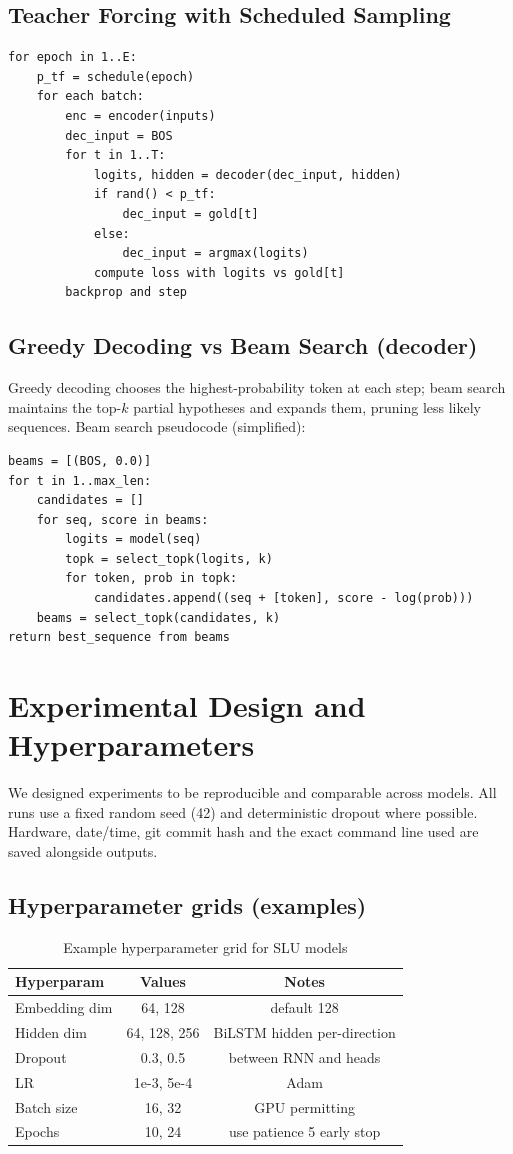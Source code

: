 \documentclass[conference]{IEEEtran}
\begin{document}
\subsection{Teacher Forcing with Scheduled Sampling}
\begin{verbatim}
for epoch in 1..E:
    p_tf = schedule(epoch)
    for each batch:
        enc = encoder(inputs)
        dec_input = BOS
        for t in 1..T:
            logits, hidden = decoder(dec_input, hidden)
            if rand() < p_tf:
                dec_input = gold[t]
            else:
                dec_input = argmax(logits)
            compute loss with logits vs gold[t]
        backprop and step
\end{verbatim}

\subsection{Greedy Decoding vs Beam Search (decoder)}
Greedy decoding chooses the highest-probability token at each step; beam search maintains the top-$k$ partial hypotheses and expands them, pruning less likely sequences. Beam search pseudocode (simplified):
\begin{verbatim}
beams = [(BOS, 0.0)]
for t in 1..max_len:
    candidates = []
    for seq, score in beams:
        logits = model(seq)
        topk = select_topk(logits, k)
        for token, prob in topk:
            candidates.append((seq + [token], score - log(prob)))
    beams = select_topk(candidates, k)
return best_sequence from beams
\end{verbatim}

\section{Experimental Design and Hyperparameters}
We designed experiments to be reproducible and comparable across models. All runs use a fixed random seed (42) and deterministic dropout where possible. Hardware, date/time, git commit hash and the exact command line used are saved alongside outputs.

\subsection{Hyperparameter grids (examples)}
\begin{table}[!t]
  \centering
  \caption{Example hyperparameter grid for SLU models}
  \begin{tabular}{lcc}
  \toprule
  Hyperparam & Values & Notes \\
  \midrule
  Embedding dim & 64, 128 & default 128 \\
  Hidden dim & 64, 128, 256 & BiLSTM hidden per-direction \\
  Dropout & 0.3, 0.5 & between RNN and heads \\
  LR & 1e-3, 5e-4 & Adam \\
  Batch size & 16, 32 & GPU permitting \\
  Epochs & 10, 24 & use patience 5 early stop \\
  \bottomrule
  \end{tabular}
  \label{tab:hp-grid}
\end{table}
\end{document}
